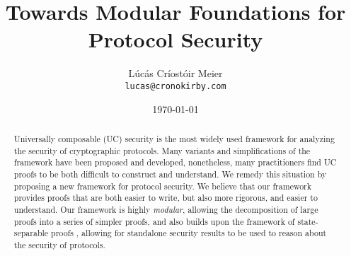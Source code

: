 

\date{\today}
\title{Towards Modular Foundations for\\ Protocol Security}
\author{Lúcás Críostóir Meier\\\texttt{lucas@cronokirby.com}}



\maketitle

\begin{abstract}

Universally composable (UC) security \cite{EPRINT:Canetti00}
is the most widely used framework for analyzing the security of cryptographic
protocols.
Many variants and simplifications of the framework have been proposed and developed,
nonetheless, many practitioners find UC proofs to be both difficult
to construct and understand.
We remedy this situation by proposing a new framework for protocol security.
We believe that our framework provides proofs that are both
easier to write, but also more rigorous, and easier to understand.
Our framework is highly \emph{modular}, allowing the decomposition
of large proofs into a series of simpler proofs,
and also builds upon
the framework of state-separable proofs
\cite{AC:BDFKK18}, allowing for standalone security results
to be used to reason about the security of protocols.
\end{abstract}










{\small }
\clearpage
\appendix


